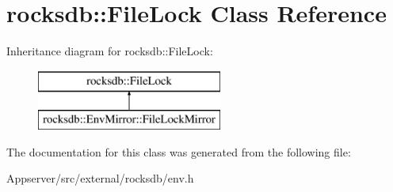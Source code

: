 \hypertarget{classrocksdb_1_1FileLock}{}\section{rocksdb\+:\+:File\+Lock Class Reference}
\label{classrocksdb_1_1FileLock}
Inheritance diagram for rocksdb\+:\+:File\+Lock\+:\begin{figure}[H]
\begin{center}
\leavevmode
\includegraphics[height=2.000000cm]{classrocksdb_1_1FileLock}
\end{center}
\end{figure}


The documentation for this class was generated from the following file\+:\begin{DoxyCompactItemize}
\item 
Appserver/src/external/rocksdb/env.\+h\end{DoxyCompactItemize}
